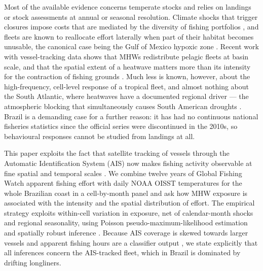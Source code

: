 \documentclass[12pt,a4paper]{article}
\begin{document}
Most of the available evidence concerns temperate stocks and relies on landings or stock assessments at annual or seasonal resolution. Climate shocks that trigger closures impose costs that are mediated by the diversity of fishing portfolios \citep{fisher2021}, and fleets are known to reallocate effort laterally when part of their habitat becomes unusable, the canonical case being the Gulf of Mexico hypoxic zone \citep{smith2014}. Recent work with vessel-tracking data shows that MHWs redistribute pelagic fleets at basin scale, and that the spatial extent of a heatwave matters more than its intensity for the contraction of fishing grounds \citep{farchadi2024}. Much less is known, however, about the high-frequency, cell-level response of a tropical fleet, and almost nothing about the South Atlantic, where heatwaves have a documented regional driver --- the atmospheric blocking that simultaneously causes South American droughts \citep{rodrigues2019}. Brazil is a demanding case for a further reason: it has had no continuous national fisheries statistics since the official series were discontinued in the 2010s, so behavioural responses cannot be studied from landings at all. %

This paper exploits the fact that satellite tracking of vessels through the Automatic Identification System (AIS) now makes fishing activity observable at fine spatial and temporal scales \citep{kroodsma2018}. We combine twelve years of Global Fishing Watch apparent fishing effort with daily NOAA OISST temperatures for the whole Brazilian coast in a cell-by-month panel and ask how MHW exposure is associated with the intensity and the spatial distribution of effort. The empirical strategy exploits within-cell variation in exposure, net of calendar-month shocks and regional seasonality, using Poisson pseudo-maximum-likelihood estimation \citep{santossilva2006,correia2020} and spatially robust inference \citep{conley1999}. Because AIS coverage is skewed towards larger vessels and apparent fishing hours are a classifier output \citep{hintzen2025}, we state explicitly that all inferences concern the AIS-tracked fleet, which in Brazil is dominated by drifting longliners.
\end{document}
